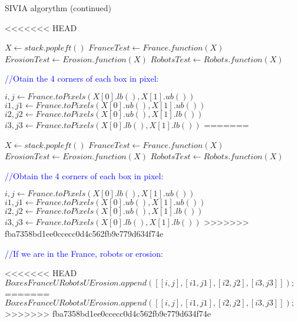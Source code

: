 \newpage

\vfill


\begin{algorithm}
  \caption{SIVIA algorythm (continued)}
  \begin{algorithmic}
  
<<<<<<< HEAD
	
		\vspace{0.3 cm}
	
  		\State $X\gets stack.popleft()$
		\State $FranceTest\gets France.function(X)$
		\State $ErosionTest\gets Erosion.function(X)$ 
		\State $RobotsTest\gets Robots.function(X)$

		\vspace{0.3 cm}

  		\textcolor{blue}{//Otain the 4 corners of each box in pixel:}\
  		 
  		
  		\State $i,j\gets France.toPixels(X[0].lb(),X[1].ub())$
		\State $i1,j1\gets France.toPixels(X[0].ub(),X[1].ub())$
		\State $i2,j2\gets France.toPixels(X[0].ub(),X[1].lb())$ 
		\State $i3,j3\gets France.toPixels(X[0].lb(),X[1].lb())$
=======
	
		\vspace{0.3 cm}
	
  		\STATE $X\gets stack.popleft()$
		\STATE $FranceTest\gets France.function(X)$
		\STATE $ErosionTest\gets Erosion.function(X)$ 
		\STATE $RobotsTest\gets Robots.function(X)$

		\vspace{0.3 cm}

  		\textcolor{blue}{//Obtain the 4 corners of each box in pixel:}\
  		 
  		
  		\STATE $i,j\gets France.toPixels(X[0].lb(),X[1].ub())$
		\STATE $i1,j1\gets France.toPixels(X[0].ub(),X[1].ub())$
		\STATE $i2,j2\gets France.toPixels(X[0].ub(),X[1].lb())$ 
		\STATE $i3,j3\gets France.toPixels(X[0].lb(),X[1].lb())$
>>>>>>> fba7358bd1ee0ccecc0d4c562fb9e779d634f74e
  
		\vspace{0.3 cm}
		
	 	\textcolor{blue}{//If we are in the France, robots or erosion:}\
	 	

<<<<<<< HEAD
     		\State $BoxesFranceURobotsUErosion.append([[i,j],[i1,j1],[i2,j2],[i3,j3]]);$
=======
     		\STATE $BoxesFranceURobotsUErosion.append([[i,j],[i1,j1],[i2,j2],[i3,j3]]);$
>>>>>>> fba7358bd1ee0ccecc0d4c562fb9e779d634f74e
     		

\end{algorithmic}
\end{algorithm}
